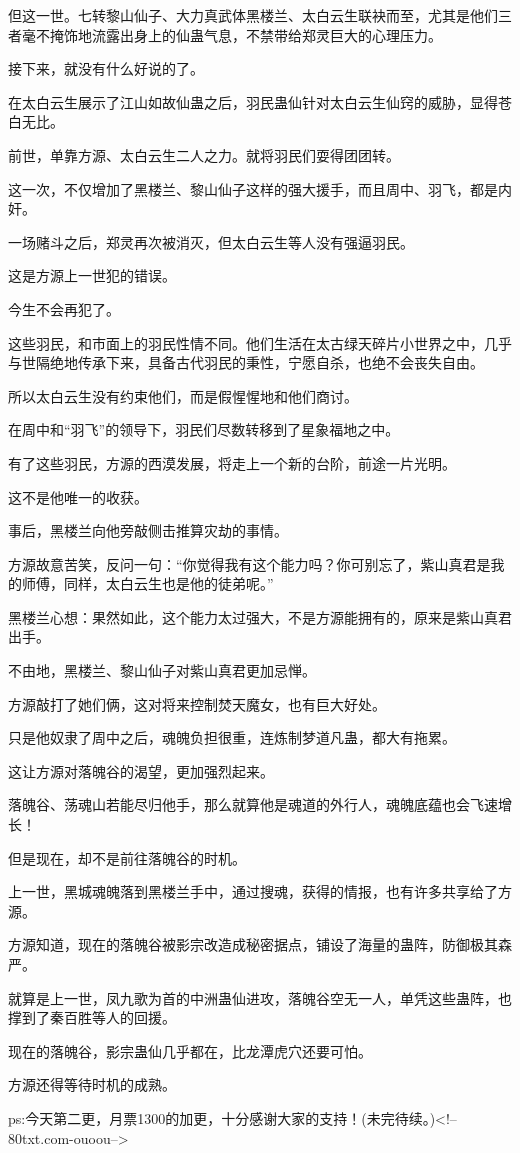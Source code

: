 \begin{this_body}
但这一世。七转黎山仙子、大力真武体黑楼兰、太白云生联袂而至，尤其是他们三者毫不掩饰地流露出身上的仙蛊气息，不禁带给郑灵巨大的心理压力。

接下来，就没有什么好说的了。

在太白云生展示了江山如故仙蛊之后，羽民蛊仙针对太白云生仙窍的威胁，显得苍白无比。

前世，单靠方源、太白云生二人之力。就将羽民们耍得团团转。

这一次，不仅增加了黑楼兰、黎山仙子这样的强大援手，而且周中、羽飞，都是内奸。

一场赌斗之后，郑灵再次被消灭，但太白云生等人没有强逼羽民。

这是方源上一世犯的错误。

今生不会再犯了。

这些羽民，和市面上的羽民性情不同。他们生活在太古绿天碎片小世界之中，几乎与世隔绝地传承下来，具备古代羽民的秉性，宁愿自杀，也绝不会丧失自由。

所以太白云生没有约束他们，而是假惺惺地和他们商讨。

在周中和“羽飞”的领导下，羽民们尽数转移到了星象福地之中。

有了这些羽民，方源的西漠发展，将走上一个新的台阶，前途一片光明。

这不是他唯一的收获。

事后，黑楼兰向他旁敲侧击推算灾劫的事情。

方源故意苦笑，反问一句：“你觉得我有这个能力吗？你可别忘了，紫山真君是我的师傅，同样，太白云生也是他的徒弟呢。”

黑楼兰心想：果然如此，这个能力太过强大，不是方源能拥有的，原来是紫山真君出手。

不由地，黑楼兰、黎山仙子对紫山真君更加忌惮。

方源敲打了她们俩，这对将来控制焚天魔女，也有巨大好处。

只是他奴隶了周中之后，魂魄负担很重，连炼制梦道凡蛊，都大有拖累。

这让方源对落魄谷的渴望，更加强烈起来。

落魄谷、荡魂山若能尽归他手，那么就算他是魂道的外行人，魂魄底蕴也会飞速增长！

但是现在，却不是前往落魄谷的时机。

上一世，黑城魂魄落到黑楼兰手中，通过搜魂，获得的情报，也有许多共享给了方源。

方源知道，现在的落魄谷被影宗改造成秘密据点，铺设了海量的蛊阵，防御极其森严。

就算是上一世，凤九歌为首的中洲蛊仙进攻，落魄谷空无一人，单凭这些蛊阵，也撑到了秦百胜等人的回援。

现在的落魄谷，影宗蛊仙几乎都在，比龙潭虎穴还要可怕。

方源还得等待时机的成熟。

ps:今天第二更，月票1300的加更，十分感谢大家的支持！(未完待续。)<!--80txt.com-ouoou-->

\end{this_body}

